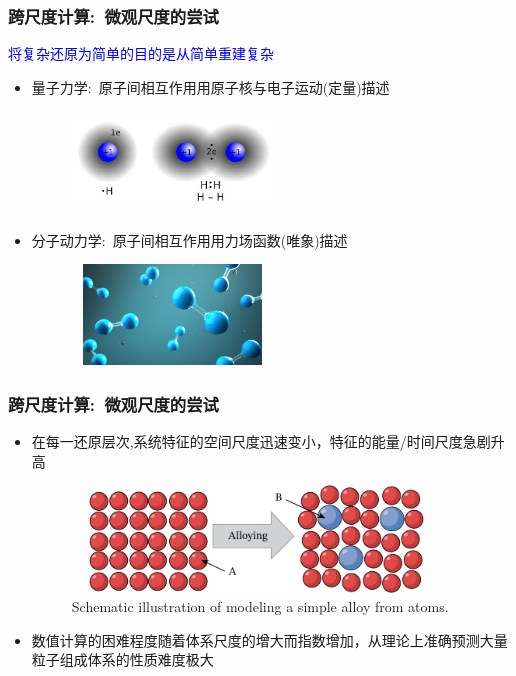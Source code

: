 \frame
{
	\frametitle{跨尺度计算:~微观尺度的尝试}
	\textcolor{blue}{将复杂还原为简单的目的是从简单重建复杂}
\begin{itemize}
	\item 量子力学:~原子间相互作用用原子核与电子运动(定量)描述
\begin{figure}[h!]
\vspace*{-0.08in}
\centering
\includegraphics[height=1.05in,width=2.10in,viewport=0 0 350 160,clip]{Figures/H-bonding.jpeg}
\label{H-bondinfg}
\end{figure}
	\item 分子动力学:~原子间相互作用用力场函数(唯象)描述
\begin{figure}[h!]
\vspace*{-0.10in}
\centering
\includegraphics[height=1.05in,width=2.10in,viewport=0 0 1050 650,clip]{Figures/Chemical_Bonding_2.jpg}
\label{Chemical_Bonding}
\end{figure}
\end{itemize}

}

\frame
{
	\frametitle{跨尺度计算:~微观尺度的尝试}
\begin{itemize}
	\item 在每一还原层次,系统特征的空间尺度迅速变小，特征的能量/时间尺度急剧升高
\begin{figure}[h!]
\vspace*{-0.08in}
\centering
\includegraphics[height=1.12in,width=3.85in,viewport=0 0 365 115,clip]{Figures/Alloy_modeling.png}
\caption{\tiny \textrm{Schematic illustration of modeling a simple alloy from atoms.}}%
\label{Alloy_modeling}
\end{figure}
	\item 数值计算的困难程度随着体系尺度的增大而指数增加，从理论上准确预测大量粒子组成体系的性质难度极大
\end{itemize}
}

